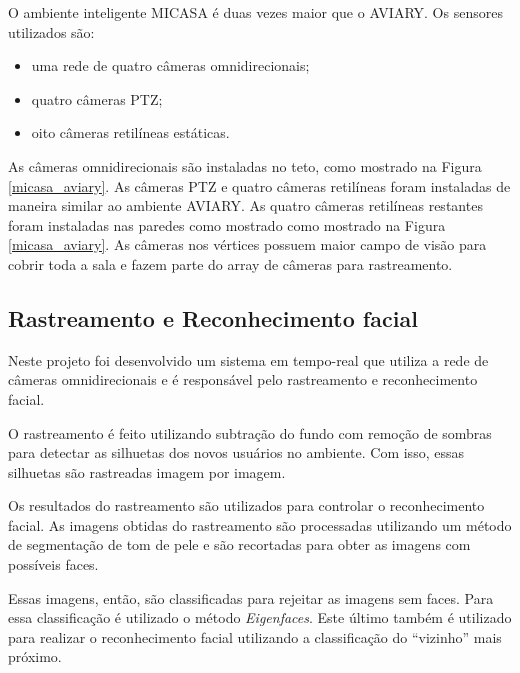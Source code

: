 
O ambiente inteligente MICASA é duas vezes maior que o AVIARY. Os sensores utilizados são:
	
	\begin{itemize}
		\item uma rede de quatro câmeras omnidirecionais;
		\item quatro câmeras PTZ;
		\item oito câmeras retilíneas estáticas.
	\end{itemize}

As câmeras omnidirecionais são instaladas no teto, como mostrado na Figura \ref{micasa_aviary}. As câmeras PTZ e quatro câmeras retilíneas foram instaladas de maneira similar ao ambiente AVIARY. As quatro câmeras retilíneas restantes foram instaladas nas paredes como mostrado como mostrado na Figura \ref{micasa_aviary}. As câmeras nos vértices possuem maior campo de visão para cobrir toda a sala e fazem parte do array de câmeras para rastreamento.

\subsection{Rastreamento e Reconhecimento facial}
 
Neste projeto foi desenvolvido um sistema em tempo-real que utiliza a rede de câmeras omnidirecionais e é responsável pelo rastreamento e reconhecimento facial. 

O rastreamento é feito utilizando subtração do fundo com remoção de sombras para detectar as silhuetas dos novos usuários no ambiente.  Com isso, essas silhuetas são rastreadas imagem por imagem.

Os resultados do rastreamento são utilizados para controlar o reconhecimento facial. As imagens obtidas do rastreamento são processadas utilizando um método de segmentação de tom de pele e são recortadas para obter as imagens com possíveis faces. 

Essas imagens, então, são classificadas para rejeitar as imagens sem faces. Para essa classificação é utilizado o método \textit{Eigenfaces}. Este último também é utilizado para realizar o reconhecimento facial utilizando a classificação do ``vizinho'' mais próximo.


